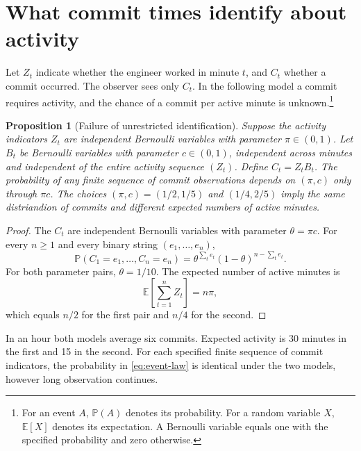 \documentclass[11pt,a4paper]{amsart}
\newtheorem{proposition}{Proposition}[section]
\newcommand{\E}{\mathbb E}
\newcommand{\Prb}{\mathbb P}
\begin{document}
\section{What commit times identify about activity}
\label{sec:observation}

Let $Z_t$ indicate whether the engineer worked in minute $t$, and $C_t$ whether a commit occurred. The observer sees only $C_t$. In the following model a commit requires activity, and the chance of a commit per active minute is unknown.\footnote{For an event $A$, $\Prb(A)$ denotes its probability. For a random variable $X$, $\E[X]$ denotes its expectation. A Bernoulli variable equals one with the specified probability and zero otherwise.}

\begin{proposition}[Failure of unrestricted identification]
\label{prop:nonidentification}
Suppose the activity indicators $Z_t$ are independent Bernoulli variables with parameter $\pi\in(0,1)$. Let $B_t$ be Bernoulli variables with parameter $c\in(0,1)$, independent across minutes and independent of the entire activity sequence $(Z_t)$. Define $C_t=Z_tB_t$. The probability of any finite sequence of commit observations depends on $(\pi,c)$ only through $\pi c$. The choices $(\pi,c)=(1/2,1/5)$ and $(1/4,2/5)$ imply the same distriandion of commits and different expected numbers of active minutes.
\end{proposition}

\begin{proof}
The $C_t$ are independent Bernoulli variables with parameter $\theta=\pi c$. For every $n\geq1$ and every binary string $(e_1,\ldots,e_n)$,
\begin{equation}
\label{eq:event-law}
 \Prb(C_1=e_1,\ldots,C_n=e_n)
 =\theta^{\sum_t e_t}(1-\theta)^{n-\sum_t e_t}.
\end{equation}
For both parameter pairs, $\theta=1/10$. The expected number of active minutes is
\begin{equation}
\label{eq:activity-total}
 \E\!\left[\sum_{t=1}^{n}Z_t\right]=n\pi,
\end{equation}
which equals $n/2$ for the first pair and $n/4$ for the second.
\end{proof}

In an hour both models average six commits. Expected activity is 30 minutes in the first and 15 in the second. For each specified finite sequence of commit indicators, the probability in \eqref{eq:event-law} is identical under the two models, however long observation continues.
\end{document}
